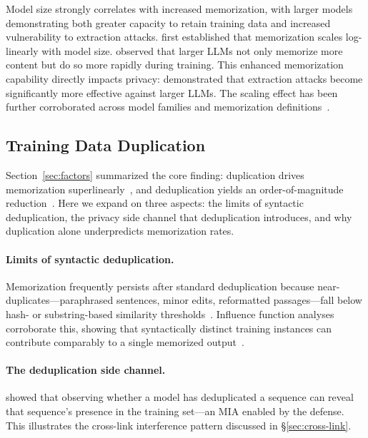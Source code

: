\documentclass[11pt]{article}
\begin{document}
Model size strongly correlates with increased memorization, with larger models
demonstrating both greater capacity to retain training data and increased
vulnerability to extraction attacks.
\citet{carlini2021extractingtrainingdatalarge} first established that
memorization scales log-linearly with model size.
\citet{tirumala2022memorizationoverfittinganalyzingtraining} observed that
larger LLMs not only memorize more content but do so more rapidly during
training.
This enhanced memorization capability directly impacts privacy:
\citet{li2024llmpbeassessingdataprivacy} demonstrated that extraction attacks
become significantly more effective against larger LLMs\@.
The scaling effect has been further corroborated across model families and
memorization
definitions~\citep{lee2022deduplicating,
carlini2023quantifyingmemorizationneurallanguage,
hayes2025measuringmemorizationlanguagemodels}.

\subsection{Training Data Duplication}
\label{app:duplication}

Section~\ref{sec:factors} summarized the core finding: duplication drives
memorization superlinearly~\citep{kandpal2022deduplicatingtrainingdatamitigates},
and deduplication yields an order-of-magnitude
reduction~\citep{lee2022deduplicating}.
Here we expand on three aspects: the limits of syntactic deduplication, the
privacy side channel that deduplication introduces, and why duplication alone
underpredicts memorization rates.

\paragraph{Limits of syntactic deduplication.}
Memorization frequently persists after standard deduplication because
near-duplicates---paraphrased sentences, minor edits, reformatted
passages---fall below hash- or substring-based similarity
thresholds~\citep{SHSP2024}.
Influence function analyses corroborate this, showing that syntactically
distinct training instances can contribute comparably to a single memorized
output~\citep{menta2025analyzing}.

\paragraph{The deduplication side channel.}
\citet{debenedetti2024privacy} showed that observing whether a model has
deduplicated a sequence can reveal that sequence's presence in the training
set---an MIA enabled by the defense.
This illustrates the cross-link interference pattern discussed in
\S\ref{sec:cross-link}.
\end{document}
